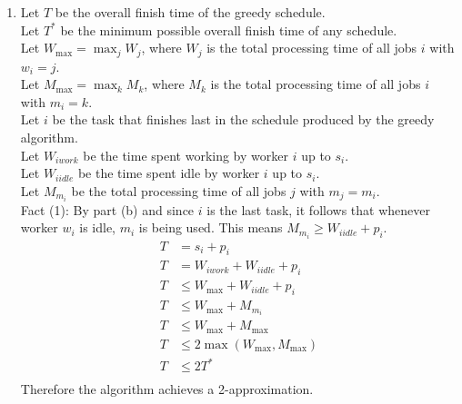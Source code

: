\documentclass{article}
\begin{document}
\begin{enumerate}
\begin{enumerate}
        \item Let $T$ be the overall finish time of the greedy schedule.\\
        Let $T^*$ be the minimum possible overall finish time of any schedule.\\
        Let $W_{\text{max}} = \max_jW_j$, where $W_j$ is the total processing time of all jobs $i$ with $w_i = j$.\\
        Let $M_{\text{max}} = \max_kM_k$, where $M_k$ is the total processing time of all jobs $i$ with $m_i = k$.\\
        Let $i$ be the task that finishes last in the schedule produced by the greedy algorithm. \\
        Let $W_{iwork}$ be the time spent working by worker $i$ up to $s_i$.  \\
        Let $W_{iidle}$ be the time spent idle by worker $i$ up to $s_i$. \\
        Let $M_{m_i}$ be the total processing time of all jobs $j$ with $m_j = {m_i}$.\\
        Fact (1): By part (b) and since $i$ is the last task, it follows that whenever worker $w_i$ is idle, $m_i$ is being used. This means $M_{m_i} \geq W_{iidle} + p_i$.
        \begin{align*}
        T &= s_i + p_i\\
        T &= W_{iwork} + W_{iidle}+ p_i \\
        T &\leq  W_\max + W_{iidle}+ p_i \\
        T &\leq  W_\max + M_{m_i} \tag{By fact (1)}\\
        T &\leq  W_\max + M_\max \\
        T &\leq  2\max(W_{\max}, M_{\max}) \\
        T &\leq  2T^* \\
        \end{align*}
        Therefore the algorithm achieves a 2-approximation.
    \end{enumerate}
    

\end{enumerate}
\end{document}
